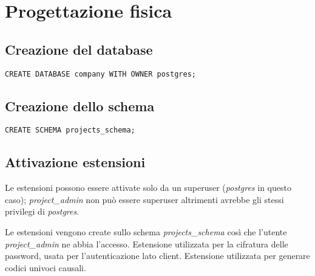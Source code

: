 \section{Progettazione fisica}
\subsection{Creazione del database}
\begin{lstlisting}
CREATE DATABASE company WITH OWNER postgres;
\end{lstlisting}

\subsection{Creazione dello schema}
\begin{lstlisting}
CREATE SCHEMA projects_schema;
\end{lstlisting}

\subsection{Attivazione estensioni}
Le estensioni possono essere attivate solo da un superuser (\textit{postgres} in questo caso); \textit{project\_admin} non può essere superuser altrimenti avrebbe gli stessi privilegi di \textit{postgres}.

Le estensioni vengono create sullo schema \textit{projects\_schema} così che l'utente \textit{project\_admin} ne abbia l'accesso.\meskip
Estensione utilizzata per la cifratura delle password, usata per l'autenticazione lato client.
\medskip
Estensione utilizzata per generare codici univoci causali.



